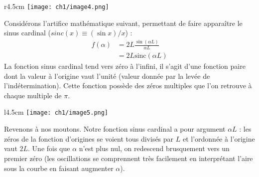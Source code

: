 \begin{wrapfigure}[8]{r}{4.5cm}
\vspace{-5mm}
\texttt{[image: ch1/image4.png]}
\end{wrapfigure}
Considérons l'artifice mathématique suivant, permettant de faire apparaître le 
sinus cardinal ($sinc(x) \equiv (\sin x)/x$) :
\begin{equation}
\begin{array}{ll}
f(\alpha) &= 2L \frac{\sin(\alpha L)}{\alpha L}\\
&= 2L\text{sinc}(\alpha L)
\end{array}
\end{equation}
La fonction sinus cardinal tend vers zéro à l'infini, il s'agit d'une fonction paire dont 
la valeur à l'origine vaut l'unité (valeur donnée par la levée de l'indétermination). Cette 
fonction possède des zéros multiples que l'on retrouve à chaque multiple de $\pi$.\newpage

\begin{wrapfigure}[8]{l}{4.5cm}
\texttt{[image: ch1/image5.png]}
\end{wrapfigure}
Revenons à nos moutons. Notre fonction sinus cardinal a pour argument $\alpha L$ : les zéros 
de la fonction d'origines se voient tous divisés par $L$ et l'ordonnée à l'origine vaut $2L$. 
Une fois que $\alpha$ n'est plus nul, on redescend brusquement vers un premier zéro (les 
oscillations se comprennent très facilement en interprétant l'aire sous la courbe en faisant 
augmenter $\alpha$).\\
\ \\

